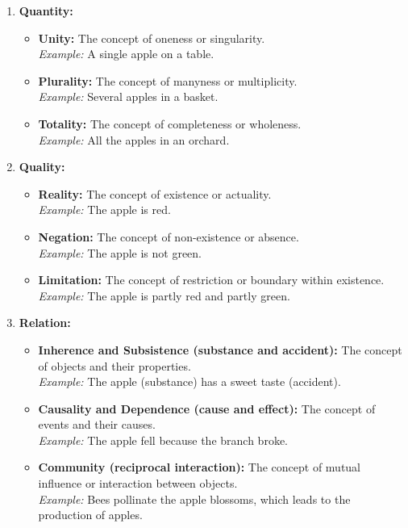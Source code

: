 \documentclass[a4paper]{article}
\begin{document}
\begin{enumerate}
    \item \textbf{Quantity:}
    \begin{itemize}
        \item \textbf{Unity:} The concept of oneness or singularity. \\
        \textit{Example:} A single apple on a table.
        \item \textbf{Plurality:} The concept of manyness or multiplicity. \\
        \textit{Example:} Several apples in a basket.
        \item \textbf{Totality:} The concept of completeness or wholeness. \\
        \textit{Example:} All the apples in an orchard.
    \end{itemize}
    \item \textbf{Quality:}
    \begin{itemize}
        \item \textbf{Reality:} The concept of existence or actuality. \\
        \textit{Example:} The apple is red.
        \item \textbf{Negation:} The concept of non-existence or absence. \\
        \textit{Example:} The apple is not green.
        \item \textbf{Limitation:} The concept of restriction or boundary within existence. \\
        \textit{Example:} The apple is partly red and partly green.
    \end{itemize}
    \item \textbf{Relation:}
    \begin{itemize}
        \item \textbf{Inherence and Subsistence (substance and accident):} The concept of objects and their properties. \\
        \textit{Example:} The apple (substance) has a sweet taste (accident).
        \item \textbf{Causality and Dependence (cause and effect):} The concept of events and their causes. \\
        \textit{Example:} The apple fell because the branch broke.
        \item \textbf{Community (reciprocal interaction):} The concept of mutual influence or interaction between objects. \\
        \textit{Example:} Bees pollinate the apple blossoms, which leads to the production of apples.

\end{itemize}
\end{enumerate}
\end{document}
